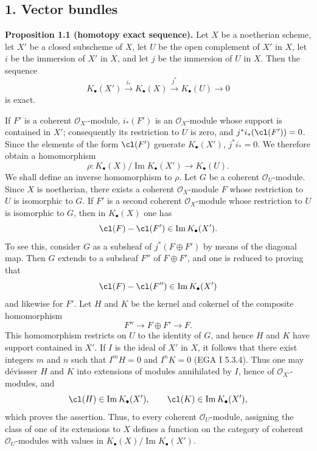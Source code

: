 \subsection*{1. Vector bundles}

\textbf{Proposition 1.1 (homotopy exact sequence).} Let $X$ be a noetherian scheme, let $X'$ be a closed subscheme of $X$, let $U$ be the open complement of $X'$ in $X$, let $i$ be the immersion of $X'$ in $X$, and let $j$ be the immersion of $U$ in $X$. Then the sequence
\[
 K_\bullet(X')\xrightarrow{i_*}K_\bullet(X)\xrightarrow{j^*}K_\bullet(U)\longrightarrow 0
\]
is exact.

If $F'$ is a coherent $\mathcal O_{X'}$-module, $i_*(F')$ is an $\mathcal O_X$-module whose support is contained in $X'$; consequently its restriction to $U$ is zero, and $j^*i_*(\cl(F'))=0$. Since the elements of the form $\cl(F')$ generate $K_\bullet(X')$, $j^*i_*=0$. We therefore obtain a homomorphism
\[
 \rho:K_\bullet(X)/\operatorname{Im}K_\bullet(X')\longrightarrow K_\bullet(U).
\]
We shall define an inverse homomorphism to $\rho$. Let $G$ be a coherent $\mathcal O_U$-module. Since $X$ is noetherian, there exists a coherent $\mathcal O_X$-module $F$ whose restriction to $U$ is isomorphic to $G$. If $F'$ is a second coherent $\mathcal O_X$-module whose restriction to $U$ is isomorphic to $G$, then in $K_\bullet(X)$ one has
\[
 \cl(F)-\cl(F')\in \operatorname{Im}K_\bullet(X').
\]
To see this, consider $G$ as a subsheaf of $j^*(F\oplus F')$ by means of the diagonal map. Then $G$ extends to a subsheaf $F''$ of $F\oplus F'$, and one is reduced to proving that
\[
 \cl(F)-\cl(F'')\in \operatorname{Im}K_\bullet(X')
\]
and likewise for $F'$. Let $H$ and $K$ be the kernel and cokernel of the composite homomorphism
\[
 F''\longrightarrow F\oplus F'\longrightarrow F.
\]
This homomorphism restricts on $U$ to the identity of $G$, and hence $H$ and $K$ have support contained in $X'$. If $I$ is the ideal of $X'$ in $X$, it follows that there exist integers $m$ and $n$ such that $I^mH=0$ and $I^nK=0$ (EGA I 5.3.4). Thus one may dévissser $H$ and $K$ into extensions of modules annihilated by $I$, hence of $\mathcal O_{X'}$-modules, and
\[
 \cl(H)\in\operatorname{Im}K_\bullet(X'),\qquad \cl(K)\in\operatorname{Im}K_\bullet(X'),
\]
which proves the assertion. Thus, to every coherent $\mathcal O_U$-module, assigning the class of one of its extensions to $X$ defines a function on the category of coherent $\mathcal O_U$-modules with values in $K_\bullet(X)/\operatorname{Im}K_\bullet(X')$.

